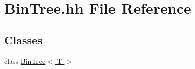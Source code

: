 \hypertarget{_bin_tree_8hh}{}\section{Bin\+Tree.\+hh File Reference}
\label{_bin_tree_8hh}
\subsection*{Classes}
\begin{DoxyCompactItemize}
\item 
class \hyperlink{class_bin_tree}{Bin\+Tree$<$ T $>$}
\end{DoxyCompactItemize}
